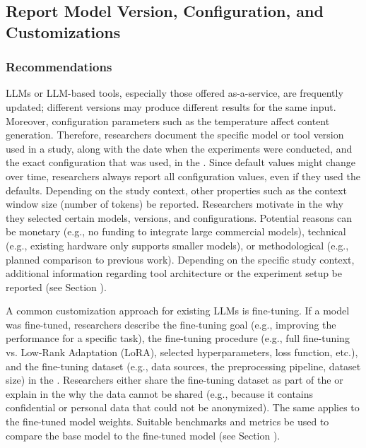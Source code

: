 



\subsection{Report Model Version, Configuration, and Customizations}

\subsubsection{Recommendations}

LLMs or LLM-based tools, especially those offered as-a-service, are frequently updated; different versions may produce different results for the same input.
Moreover, configuration parameters such as the temperature affect content generation.
Therefore, researchers \must document the specific model or tool version used in a study, along with the date when the experiments were conducted, and the exact configuration that was used, in the \paper.
Since default values might change over time, researchers \should always report all configuration values, even if they used the defaults.
Depending on the study context, other properties such as the context window size (number of tokens) \may be reported.
Researchers \should motivate in the \paper why they selected certain models, versions, and configurations.
Potential reasons can be monetary (e.g., no funding to integrate large commercial models), technical (e.g., existing hardware only supports smaller models), or methodological (e.g., planned comparison to previous work).
Depending on the specific study context, additional information regarding tool architecture or the experiment setup \should be reported (see Section \toolarchitecture).

A common customization approach for existing LLMs is fine-tuning. If a model was fine-tuned, researchers \must describe the fine-tuning goal (e.g., improving the performance for a specific task), the fine-tuning procedure (e.g., full fine-tuning vs. Low-Rank Adaptation (LoRA), selected hyperparameters, loss function, etc.), and the fine-tuning dataset (e.g., data sources, the preprocessing pipeline, dataset size) in the \paper.
Researchers \should either share the fine-tuning dataset as part of the \supplementarymaterial or explain in the \paper why the data cannot be shared (e.g., because it contains confidential or personal data that could not be anonymized).
The same applies to the fine-tuned model weights.
Suitable benchmarks and metrics \should be used to compare the base model to the fine-tuned model (see Section \benchmarksmetrics).

